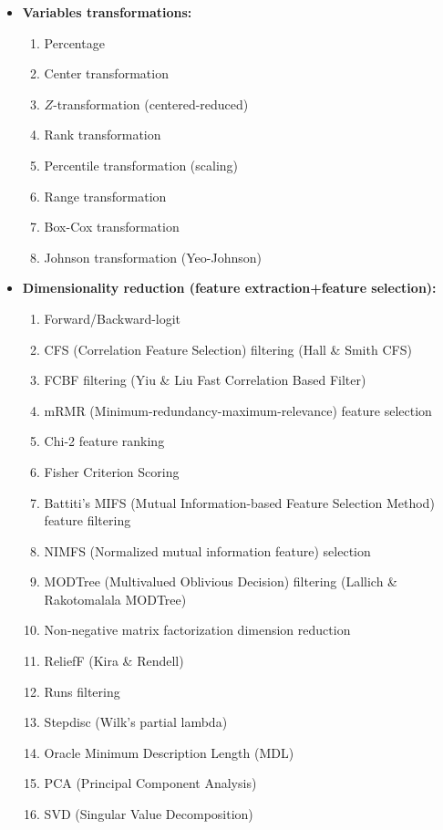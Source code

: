 	\begin{itemize}
		\item \textbf{Variables transformations:}
			\begin{enumerate}
				\item Percentage
				\item Center transformation
				\item $Z$-transformation (centered-reduced)
				\item Rank transformation
				\item Percentile transformation (scaling)
				\item Range transformation
				\item Box-Cox transformation
				\item Johnson transformation (Yeo-Johnson)
			\end{enumerate}
		\item \textbf{Dimensionality reduction (feature extraction+feature selection):}
		\begin{multicols}{2}
		\begin{enumerate}
			\item Forward/Backward-logit
			\item CFS (Correlation Feature Selection) filtering (Hall \& Smith CFS)
			\item FCBF filtering (Yiu \& Liu Fast Correlation Based Filter)
			\item mRMR (Minimum-redundancy-maximum-relevance) feature selection
			\item Chi-2 feature ranking
			\item Fisher Criterion Scoring
			\item Battiti's MIFS (Mutual Information-based Feature Selection Method) feature filtering
			\item NIMFS (Normalized mutual information feature) selection
			\item MODTree (Multivalued Oblivious Decision) filtering (Lallich \& Rakotomalala MODTree)
			\item Non-negative matrix factorization dimension reduction
			\item ReliefF (Kira \& Rendell)
			\item Runs filtering
			\item Stepdisc (Wilk's partial lambda)
			\item Oracle Minimum Description Length (MDL)
			\item PCA (Principal Component Analysis)
			\item SVD (Singular Value Decomposition)

\end{enumerate}
\end{multicols}
\end{itemize}
